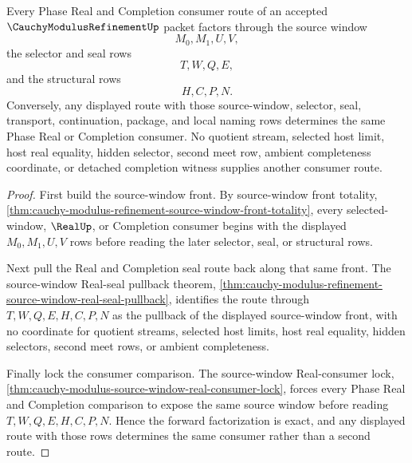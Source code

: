 \begin{theorem}
\label{thm:cauchy-modulus-refinement-completion-route-pullback-exactness}
Every Phase Real and Completion consumer route of an accepted $\CauchyModulusRefinementUp$ packet factors through the source window
$$
M_0,M_1,U,V,
$$
the selector and seal rows
$$
T,W,Q,E,
$$
and the structural rows
$$
H,C,P,N.
$$
Conversely, any displayed route with those source-window, selector, seal, transport, continuation, package, and local naming rows determines the same Phase Real or Completion consumer. No quotient stream, selected host limit, host real equality, hidden selector, second meet row, ambient completeness coordinate, or detached completion witness supplies another consumer route.
\end{theorem}
\begin{proof}
First build the source-window front. By source-window front totality, \autoref{thm:cauchy-modulus-refinement-source-window-front-totality}, every selected-window, $\RealUp$, or Completion consumer begins with the displayed $M_0,M_1,U,V$ rows before reading the later selector, seal, or structural rows.

Next pull the Real and Completion seal route back along that same front. The source-window Real-seal pullback theorem, \autoref{thm:cauchy-modulus-refinement-source-window-real-seal-pullback}, identifies the route through $T,W,Q,E,H,C,P,N$ as the pullback of the displayed source-window front, with no coordinate for quotient streams, selected host limits, host real equality, hidden selectors, second meet rows, or ambient completeness.

Finally lock the consumer comparison. The source-window Real-consumer lock, \autoref{thm:cauchy-modulus-source-window-real-consumer-lock}, forces every Phase Real and Completion comparison to expose the same source window before reading $T,W,Q,E,H,C,P,N$. Hence the forward factorization is exact, and any displayed route with those rows determines the same consumer rather than a second route.
\end{proof}

